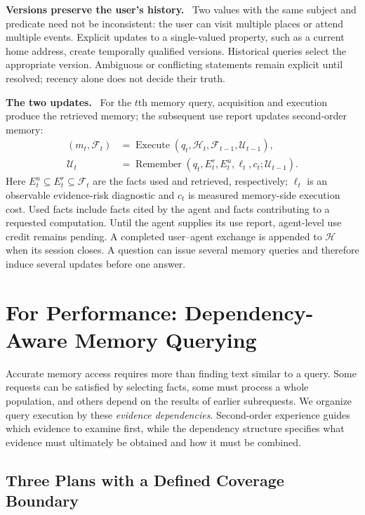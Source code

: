 \documentclass[10pt,twocolumn]{article}
\newcommand{\Hh}{\mathcal{H}}
\newcommand{\Ff}{\mathcal{F}}
\newcommand{\Uu}{\mathcal{U}}
\newcommand{\runin}[1]{\smallskip\noindent\textbf{#1.}\ }
\begin{document}
\runin{Versions preserve the user's history}
Two values with the same subject and predicate need not be inconsistent:
the user can visit multiple places or attend multiple events. Explicit
updates to a single-valued property, such as a current home address,
create temporally qualified versions. Historical queries select the
appropriate version. Ambiguous or conflicting statements remain
explicit until resolved; recency alone does not decide their truth.

\runin{The two updates}
For the $t$th memory query, acquisition and execution produce the
retrieved memory; the subsequent use report updates second-order memory:
\begin{align}
\label{eq:new-cycle}
(m_t,\Ff_t)&=\operatorname{Execute}
       (q_t,\Hh_t,\Ff_{t-1},\Uu_{t-1}),\\
\Uu_t&=\operatorname{Remember}
       (q_t,E_t^{r},E_t^{u},\ell_t,c_t;\Uu_{t-1}).
\label{eq:new-remember}
\end{align}
Here $E_t^{u}\subseteq E_t^{r}\subseteq\Ff_t$ are the facts used and
retrieved, respectively; $\ell_t$ is an observable evidence-risk
diagnostic and $c_t$ is measured memory-side execution cost. Used facts
include facts cited by the agent and facts contributing to a requested
computation. Until the agent supplies its use report, agent-level use
credit remains pending. A completed user--agent exchange is appended
to $\Hh$ when its session closes. A question can issue several memory
queries and therefore induce several updates before one answer.

\section{For Performance: Dependency-Aware Memory Querying}
\label{sec:new-performance}

Accurate memory access requires more than finding text similar to a
query. Some requests can be satisfied by selecting facts, some must
process a whole population, and others depend on the results of earlier
subrequests. We organize query execution by these \emph{evidence
dependencies}. Second-order experience guides which evidence to examine
first, while the dependency structure specifies what evidence must
ultimately be obtained and how it must be combined.

\subsection{Three Plans with a Defined Coverage Boundary}
\label{subsec:new-plans}
\end{document}

